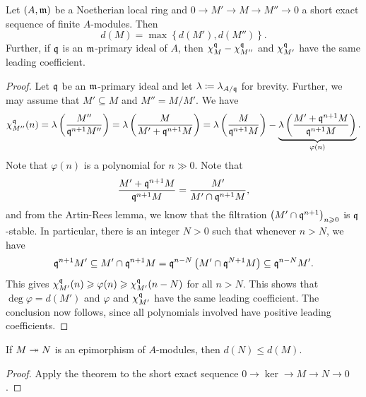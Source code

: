 \begin{theorem}
    Let $(A,\mathfrak{m})$ be a Noetherian local ring and $0\to M'\to M\to M''\to 0$ a short exact sequence of finite $A$-modules. Then 
    \begin{equation*}
        d(M) = \max\left\{d(M'), d(M'')\right\}.
    \end{equation*}
    Further, if $\mathfrak{q}$ is an $\mathfrak{m}$-primary ideal of $A$, then $\chi^{\mathfrak{q}}_{M} - \chi^{\mathfrak{q}}_{M''}$ and $\chi^{\mathfrak{q}}_{M'}$ have the same leading coefficient.
\end{theorem}
\begin{proof}
    Let $\mathfrak{q}$ be an $\mathfrak{m}$-primary ideal and let $\lambda\coloneq\lambda_{A/\mathfrak{q}}$ for brevity. Further, we may assume that $M'\subseteq M$ and $M'' = M/M'$. We have 
    \begin{equation*}
        \chi^{\mathfrak{q}}_{M''}(n) = \lambda\left(\frac{M''}{\mathfrak{q}^{n + 1}M''}\right) = \lambda\left(\frac{M}{M' + \mathfrak{q}^{n + 1}M}\right) = \lambda\left(\frac{M}{\mathfrak{q}^{n + 1}M}\right) - \underbrace{\lambda\left(\frac{M' + \mathfrak{q}^{n + 1}M}{\mathfrak{q}^{n + 1}M}\right)}_{\varphi(n)}.
    \end{equation*}
    Note that $\varphi(n)$ is a polynomial for $n\gg0$. Note that 
    \begin{equation*}
        \frac{M' + \mathfrak{q}^{n + 1}M}{\mathfrak{q}^{n + 1}M} = \frac{M'}{M'\cap\mathfrak{q}^{n + 1}M}, 
    \end{equation*}
    and from the Artin-Rees lemma, we know that the filtration $\left(M'\cap\mathfrak{q}^{n + 1}\right)_{n\geqslant 0}$ is $\mathfrak{q}$-stable. In particular, there is an integer $N > 0$ such that whenever $n > N$, we have 
    \begin{equation*}
        \mathfrak{q}^{n + 1}M'\subseteq M'\cap\mathfrak{q}^{n + 1}M = \mathfrak{q}^{n - N}\left(M'\cap\mathfrak{q}^{N + 1}M\right)\subseteq\mathfrak{q}^{n - N}M'.
    \end{equation*}
    This gives $\chi^{\mathfrak{q}}_{M'}(n)\geqslant\varphi(n)\geqslant\chi^{\mathfrak{q}}_{M'}(n - N)$ for all $n > N$. This shows that $\deg\varphi = d(M')$ and $\varphi$ and $\chi^{\mathfrak{q}}_{M'}$ have the same leading coefficient. The conclusion now follows, since all polynomials involved have positive leading coefficients.
\end{proof}

\begin{corollary}
    If $M\twoheadrightarrow N$ is an epimorphism of $A$-modules, then $d(N)\le d(M)$.
\end{corollary}
\begin{proof}
    Apply the theorem to the short exact sequence $0\to\ker\to M\to N\to 0$.
\end{proof}

